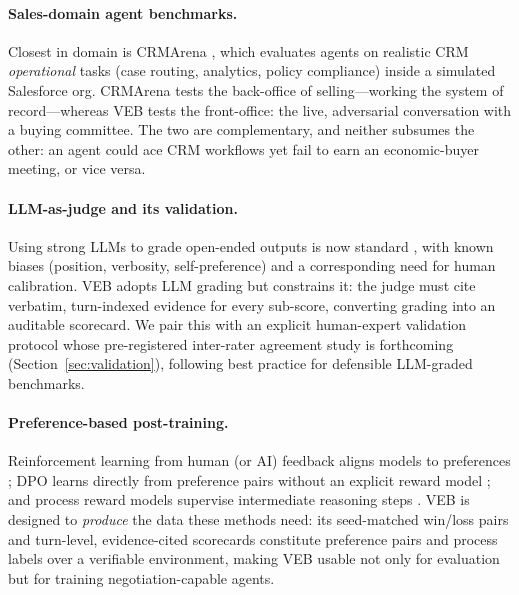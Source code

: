 \paragraph{Sales-domain agent benchmarks.}
Closest in domain is CRMArena \citep{huang2025crmarena}, which evaluates agents
on realistic CRM \emph{operational} tasks (case routing, analytics, policy
compliance) inside a simulated Salesforce org. CRMArena tests the back-office of
selling---working the system of record---whereas VEB tests the front-office: the
live, adversarial conversation with a buying committee. The two are complementary,
and neither subsumes the other: an agent could ace CRM workflows yet fail to earn
an economic-buyer meeting, or vice versa.

\paragraph{LLM-as-judge and its validation.}
Using strong LLMs to grade open-ended outputs is now standard
\citep{zheng2023judge}, with known biases (position, verbosity, self-preference)
and a corresponding need for human calibration. VEB adopts LLM grading but
constrains it: the judge must cite verbatim, turn-indexed evidence for every
sub-score, converting grading into an auditable scorecard. We pair this with an
explicit human-expert validation protocol whose pre-registered inter-rater
agreement study is forthcoming (Section~\ref{sec:validation}), following best
practice for defensible LLM-graded benchmarks.

\paragraph{Preference-based post-training.}
Reinforcement learning from human (or AI) feedback aligns models to preferences
\citep{ouyang2022instructgpt,bai2022constitutional}; DPO learns directly from
preference pairs without an explicit reward model \citep{rafailov2023dpo}; and
process reward models supervise intermediate reasoning steps
\citep{lightman2023letsverify}. VEB is designed to \emph{produce} the data these
methods need: its seed-matched win/loss pairs and turn-level, evidence-cited
scorecards constitute preference pairs and process labels over a verifiable
environment, making VEB usable not only for evaluation but for training
negotiation-capable agents.
